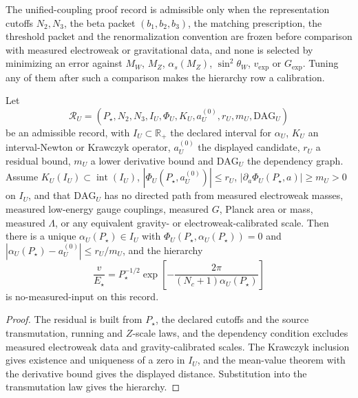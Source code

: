 \begin{definition}\label{def:no-hidden-free-variable-u}
The unified-coupling proof record is admissible only when the representation
cutoffs \(N_2,N_3\), the beta packet \((b_1,b_2,b_3)\), the matching
prescription, the threshold packet and the renormalization convention are
frozen before comparison with measured electroweak or gravitational data, and
none is selected by minimizing an error against \(M_W\), \(M_Z\),
\(\alpha_s(M_Z)\), \(\sin^2\theta_W\), \(v_{\mathrm{exp}}\) or \(G_{\mathrm{exp}}\).
Tuning any of them after such a comparison makes the hierarchy row a
calibration.
\end{definition}

\begin{theorem}\label{thm:no-input-alpha-u}
Let
\[
\mathcal R_U=(P_\star,N_2,N_3,I_U,\Phi_U,K_U,a_U^{(0)},r_U,m_U,\mathrm{DAG}_U)
\]
be an admissible record, with \(I_U\subset\mathbb R_+\) the declared interval
for \(\alpha_U\), \(K_U\) an interval-Newton or Krawczyk operator,
\(a_U^{(0)}\) the displayed candidate, \(r_U\) a residual bound, \(m_U\) a lower
derivative bound and \(\mathrm{DAG}_U\) the dependency graph. Assume
\(K_U(I_U)\subset \operatorname{int}(I_U)\),
\(|\Phi_U(P_\star,a_U^{(0)})|\le r_U\),
\(|\partial_a\Phi_U(P_\star,a)|\ge m_U>0\) on \(I_U\), and that
\(\mathrm{DAG}_U\) has no directed path from measured electroweak masses,
measured low-energy gauge couplings, measured \(G\), Planck area or mass,
measured \(\Lambda\), or any equivalent gravity- or electroweak-calibrated
scale. Then there is a unique \(\alpha_U(P_\star)\in I_U\) with
\(\Phi_U(P_\star,\alpha_U(P_\star))=0\) and
\(|\alpha_U(P_\star)-a_U^{(0)}|\le r_U/m_U\), and the hierarchy
\[
\frac{v}{E_\star}
=P_\star^{-1/2}\exp\!\left[-\frac{2\pi}{(N_c+1)\alpha_U(P_\star)}\right]
\]
is no-measured-input on this record.
\end{theorem}

\begin{proof}
The residual is built from \(P_\star\), the declared cutoffs and the source
transmutation, running and \(Z\)-scale laws, and the dependency condition
excludes measured electroweak data and gravity-calibrated scales. The
Krawczyk inclusion gives existence and uniqueness of a zero in \(I_U\), and
the mean-value theorem with the derivative bound gives the displayed
distance. Substitution into the transmutation law gives the hierarchy.
\end{proof}

